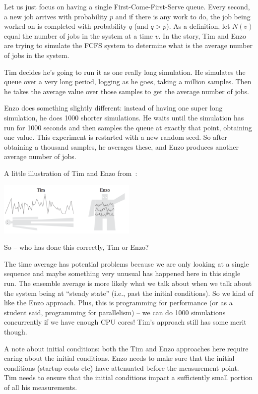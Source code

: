 Let us just focus on having a single First-Come-First-Serve queue. Every second, a new job arrives with probability $p$ and if there is any work to do, the job being worked on is completed with probability $q$ (and $q > p$). As a definition, let $N(v)$ equal the number of jobs in the system at a time $v$. In the story, Tim and Enzo are trying to simulate the FCFS system to determine what is the average number of jobs in the system. 

Tim decides he's going to run it as one really long simulation. He simulates the queue over a very long period, logging as he goes, taking a million samples. Then he takes the average value over those samples to get the average number of jobs.

Enzo does something slightly different: instead of having one super long simulation, he does 1000 shorter simulations. He waits until the simulation has run for 1000 seconds and then samples the queue at exactly that point, obtaining one value. This experiment is restarted with a new random seed. So after obtaining a thousand samples, he averages these, and Enzo produces another average number of jobs.

A little illustration of Tim and Enzo from~\cite{pmd}:

\begin{center}
	\includegraphics[width=0.5\textwidth]{images/timenzo.png}
\end{center}

So -- who has done this correctly, Tim or Enzo?

The time average has potential problems because we are only looking at a single sequence and maybe something very unusual has happened here in this single run. The ensemble average is more likely what we talk about when we talk about the system being at ``steady state'' (i.e., past the initial conditions). So we kind of like the Enzo approach. Plus, this is programming for performance (or as a student said, programming for parallelism) -- we can do 1000 simulations concurrently if we have enough CPU cores! Tim's approach still has some merit though.

A note about initial conditions: both the Tim and Enzo approaches here require caring about the initial conditions. Enzo needs to make sure that the initial conditions (startup costs etc) have attenuated before the measurement point. Tim needs to ensure that the initial conditions impact a sufficiently small portion of all his measurements.

